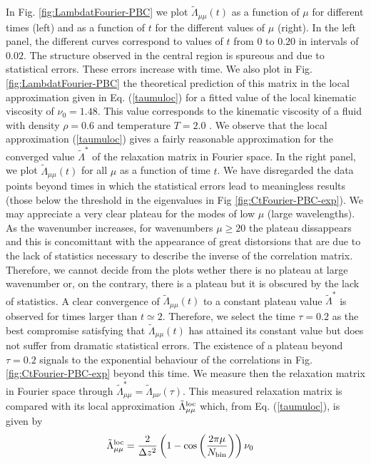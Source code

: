 \documentclass[a4paper,openright,12pt]{book}
\newcommand{\Pendiente}[1]{{\color{green}#1}} %
\begin{document}
In       Fig.         \ref{fig:LambdatFourier-PBC}       we       plot
$\tilde{\Lambda}_{\mu\mu}(t)$  as a  function of  $\mu$ for  different
times (left) and as a function of $t$ for the different values of $\mu$
(right). In the left panel,  the different curves correspond to values
of  $t$ from  $0$ to  $0.20$ in  intervals of  $0.02$.  The  structure
observed  in the  central region  is spureous  and due  to statistical
errors.   These   errors  increase  with   time.   We  also   plot  in
Fig. \ref{fig:LambdatFourier-PBC}  the theoretical prediction  of this
matrix in the local approximation  given in Eq. (\ref{taumuloc}) for a
fitted value  of the  local kinematic  viscosity of  $\nu_0=1.48$. \Pendiente{This value corresponds to the kinematic viscosity of a fluid with density $\rho=0.6$ and temperature $T=2.0$ \cite{Woodcock2006}}.  We
observe that  the local approximation (\ref{taumuloc})  gives a fairly
reasonable approximation  for the converged  value $\tilde{\Lambda}^*$
of the  relaxation matrix in Fourier  space.  In the right  panel, we
plot $\tilde{\Lambda}_{\mu\mu}(t)$ for all $\mu$ as a function of time
$t$.  We  have disregarded the data  points beyond times in  which the
statistical  errors  lead  to  meaningless results  (those  below  the
threshold  in  the  eigenvalues  in Fig  \ref{fig:CtFourier-PBC-exp}).   We  may
appreciate a  very clear  plateau for  the modes  of low  $\mu$ (large
wavelengths).  As the wavenumber increases, for wavenumbers $\mu\ge20$
the plateau dissappears  and this is concomittant  with the appearance
of great distorsions that are due  to the lack of statistics necessary
to describe  the inverse  of the correlation matrix.  Therefore, we  cannot decide
from the plots  wether there is no plateau at  large wavenumber or, on
the contrary,  there is a  plateau but it is  obscured by the  lack of
statistics.  A clear convergence of $\tilde{\Lambda}_{\mu\mu}(t)$ to a
constant  plateau  value  $\tilde{\Lambda}^*$ is  observed  for  times
larger than $t\simeq  2$. Therefore, we select the  time $\tau=0.2$ as
the best compromise  satisfying that $\tilde{\Lambda}_{\mu\mu}(t)$ has
attained  its  constant  value  but  does  not  suffer  from  dramatic
statistical errors.     The existence  of a  plateau
beyond  $\tau=0.2$  signals  to   the  exponential  behaviour  of  the
correlations  in  Fig.   \ref{fig:CtFourier-PBC-exp}  beyond  this  time.   We
measure  then   the  relaxation   matrix  in  Fourier   space  through
$\tilde{\Lambda}^*_{\mu\mu}=\tilde{\Lambda}_{\mu\nu}(\tau)$.      This
measured relaxation  matrix is  compared with its  local approximation
$\tilde{\Lambda}^{\rm loc}_{\mu\mu}$ which, from Eq. (\ref{taumuloc}),
is given by
\begin{align}
\tilde{\Lambda}^{\rm loc}_{\mu\mu}&=\frac{2}{\Delta z^2}
\left(1-\cos\left( \frac{2\pi \mu}{N_{\rm bin}}\right)\right)
\nu_0
\label{Lambdaloc}
\end{align}
\end{document}
